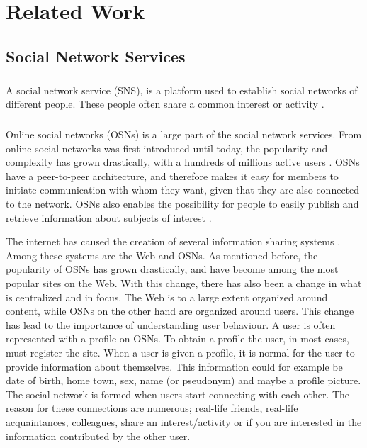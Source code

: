 \chapter{Related Work}
\label{chp:relatedwork} 


\section{Social Network Services}
\paragraph{}
A social network service (SNS), is a platform used to establish social networks of different people. These people often share a common interest or activity \cite{SNS}. 
\paragraph{}
Online social networks (OSNs) is a large part of the social network services. From online social networks was first introduced until today, the popularity and complexity has grown drastically, with a hundreds of millions active users \cite{OSN}. OSNs have a peer-to-peer architecture, and therefore makes it easy for members to initiate communication with whom they want, given that they are also connected to the network. OSNs also enables the possibility for people to easily publish and retrieve information about subjects of interest \cite{DPBook}. 

The internet has caused the creation of several information sharing systems \cite{OSNpaper}. Among these systems are the Web and OSNs. As mentioned before, the popularity of OSNs has grown drastically, and have become among the most popular sites on the Web. With this change, there has also been a change in what is centralized and in focus. The Web is to a large extent organized around content, while OSNs on the other hand are organized around users. This change has lead to the importance of understanding user behaviour. A user is often represented with a profile on OSNs. To obtain a profile the user, in most cases, must register the site. When a user is given a profile, it is normal for the user to provide information about themselves. This information could for example be date of birth, home town, sex, name (or pseudonym) and maybe a profile picture. The social network is formed when users start connecting with each other. The reason for these connections are numerous; real-life friends, real-life acquaintances, colleagues, share an interest/activity or if you are interested in the information contributed by the other user. 

